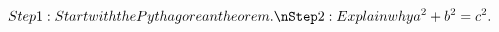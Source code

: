 \documentclass[preview]{standalone}
\begin{document}
\begin{align*}
Step 1: Start with the Pythagorean theorem.\nStep 2: Explain why a^2 + b^2 = c^2.
\end{align*}
\end{document}

